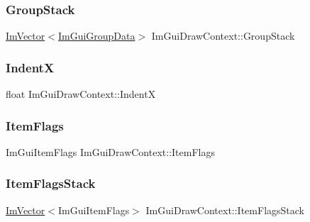 \hypertarget{struct_im_gui_draw_context_aa775f16a46bdfe8e131e25cab733afe0}{}\label{struct_im_gui_draw_context_aa775f16a46bdfe8e131e25cab733afe0} 
\subsubsection{\texorpdfstring{Group\+Stack}{GroupStack}}
{\footnotesize\ttfamily \hyperlink{class_im_vector}{Im\+Vector}$<$\hyperlink{struct_im_gui_group_data}{Im\+Gui\+Group\+Data}$>$ Im\+Gui\+Draw\+Context\+::\+Group\+Stack}

\hypertarget{struct_im_gui_draw_context_a3697085dca9164ca840d1fb1d52c8a66}{}\label{struct_im_gui_draw_context_a3697085dca9164ca840d1fb1d52c8a66} 
\subsubsection{\texorpdfstring{IndentX}{IndentX}}
{\footnotesize\ttfamily float Im\+Gui\+Draw\+Context\+::\+IndentX}

\hypertarget{struct_im_gui_draw_context_a8581650b6011e19f09b12b8bc50a51f5}{}\label{struct_im_gui_draw_context_a8581650b6011e19f09b12b8bc50a51f5} 
\subsubsection{\texorpdfstring{Item\+Flags}{ItemFlags}}
{\footnotesize\ttfamily Im\+Gui\+Item\+Flags Im\+Gui\+Draw\+Context\+::\+Item\+Flags}

\hypertarget{struct_im_gui_draw_context_a895d75185a81dc21bb6153090ab5b018}{}\label{struct_im_gui_draw_context_a895d75185a81dc21bb6153090ab5b018} 
\subsubsection{\texorpdfstring{Item\+Flags\+Stack}{ItemFlagsStack}}
{\footnotesize\ttfamily \hyperlink{class_im_vector}{Im\+Vector}$<$Im\+Gui\+Item\+Flags$>$ Im\+Gui\+Draw\+Context\+::\+Item\+Flags\+Stack}

